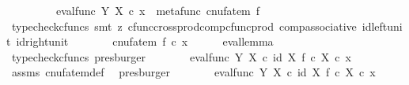\begin{isabellebody}
\ \ \ \ \ \ \ \ \ eval{\isacharunderscore}{\kern0pt}func\ Y\ X\ {\isasymcirc}\isactrlsub c\ {\isasymlangle}x\ {\isacharcomma}{\kern0pt}\ metafunc\ {\isacharparenleft}{\kern0pt}cnufatem\ f{\isacharparenright}{\kern0pt}{\isasymrangle}{\isachardoublequoteclose}\isanewline
\ \ \ \ \isamarkupfalse%
\ {\isacharparenleft}{\kern0pt}typecheck{\isacharunderscore}{\kern0pt}cfuncs{\isacharcomma}{\kern0pt}\ smt\ {\isacharparenleft}{\kern0pt}z{}{\isacharparenright}{\kern0pt}\ cfunc{\isacharunderscore}{\kern0pt}cross{\isacharunderscore}{\kern0pt}prod{\isacharunderscore}{\kern0pt}comp{\isacharunderscore}{\kern0pt}cfunc{\isacharunderscore}{\kern0pt}prod\ comp{\isacharunderscore}{\kern0pt}associative{}\ id{\isacharunderscore}{\kern0pt}left{\isacharunderscore}{\kern0pt}unit{}\ id{\isacharunderscore}{\kern0pt}right{\isacharunderscore}{\kern0pt}unit{}{\isacharparenright}{\kern0pt}\isanewline
\ \ \isamarkupfalse%
\ \isamarkupfalse%
\ {\isachardoublequoteopen}{\isachardot}{\kern0pt}{\isachardot}{\kern0pt}{\isachardot}{\kern0pt}\ {\isacharequal}{\kern0pt}\ {\isacharparenleft}{\kern0pt}cnufatem\ f{\isacharparenright}{\kern0pt}\ {\isasymcirc}\isactrlsub c\ x{\isachardoublequoteclose}\isanewline
\ \ \ \ \isamarkupfalse%
\ eval{\isacharunderscore}{\kern0pt}lemma\ \isamarkupfalse%
\ {\isacharparenleft}{\kern0pt}typecheck{\isacharunderscore}{\kern0pt}cfuncs{\isacharcomma}{\kern0pt}\ presburger{\isacharparenright}{\kern0pt}\isanewline
\ \ \isamarkupfalse%
\ \isamarkupfalse%
\ {\isachardoublequoteopen}{\isachardot}{\kern0pt}{\isachardot}{\kern0pt}{\isachardot}{\kern0pt}\ {\isacharequal}{\kern0pt}\ {\isacharparenleft}{\kern0pt}eval{\isacharunderscore}{\kern0pt}func\ Y\ X\ {\isasymcirc}\isactrlsub c\ {\isasymlangle}id\ X{\isacharcomma}{\kern0pt}\ f\ {\isasymcirc}\isactrlsub c\ {\isasymbeta}\isactrlbsub X\isactrlesub {\isasymrangle}{\isacharparenright}{\kern0pt}\ {\isasymcirc}\isactrlsub c\ x{\isachardoublequoteclose}\isanewline
\ \ \ \ \isamarkupfalse%
\ assms\ cnufatem{\isacharunderscore}{\kern0pt}def{}\ \isamarkupfalse%
\ presburger\isanewline
\ \ \isamarkupfalse%
\ \isamarkupfalse%
\ {\isachardoublequoteopen}{\isachardot}{\kern0pt}{\isachardot}{\kern0pt}{\isachardot}{\kern0pt}\ {\isacharequal}{\kern0pt}\ eval{\isacharunderscore}{\kern0pt}func\ Y\ X\ {\isasymcirc}\isactrlsub c\ {\isasymlangle}id\ X{\isacharcomma}{\kern0pt}\ f\ {\isasymcirc}\isactrlsub c\ {\isasymbeta}\isactrlbsub X\isactrlesub {\isasymrangle}\ {\isasymcirc}\isactrlsub c\ x{\isachardoublequoteclose}\isanewline

\end{isabellebody}

